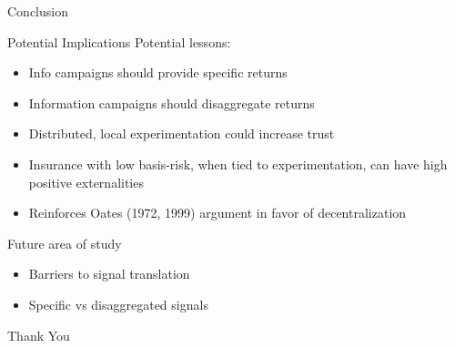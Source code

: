 \documentclass[
  ignorenonframetext,
]{beamer}
\providecommand{\tightlist}{%
  \setlength{\itemsep}{0pt}\setlength{\parskip}{0pt}}\usepackage{longtable,booktabs,array}
\begin{document}
\begin{frame}{Conclusion}
\protect\hypertarget{conclusion}{}
\end{frame}

\begin{frame}{Potential Implications}
\protect\hypertarget{potential-implications}{}
Potential lessons:

\begin{itemize}
\tightlist
\item
  Info campaigns should provide specific returns
\item
  Information campaigns should disaggregate returns
\item
  Distributed, local experimentation could increase trust
\item
  Insurance with low basis-risk, when tied to experimentation, can have
  high positive externalities
\item
  Reinforces Oates (1972, 1999) argument in favor of decentralization
\end{itemize}
\end{frame}

\begin{frame}{Future area of study}
\protect\hypertarget{future-area-of-study}{}
\begin{itemize}
\tightlist
\item
  Barriers to signal translation
\item
  Specific vs disaggregated signals
\end{itemize}
\end{frame}

\begin{frame}{Thank You}
\protect\hypertarget{thank-you}{}
\end{frame}
\end{document}
